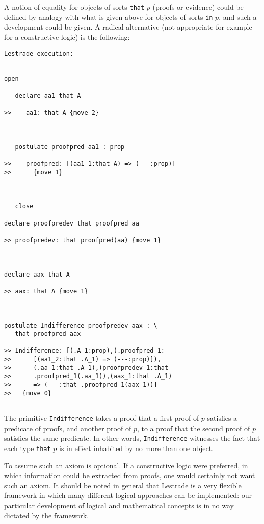 \documentclass[12pt]{article}
\begin{document}
A notion of equality for objects of sorts {\tt that} $p$ (proofs or evidence) could be defined by analogy with what is given above for objects of sorts
{\tt in} $p$, and such a development could be given.  A radical alternative (not appropriate for example for a constructive logic) is the following:

\begin{verbatim}Lestrade execution:


open

   declare aa1 that A

>>    aa1: that A {move 2}



   postulate proofpred aa1 : prop

>>    proofpred: [(aa1_1:that A) => (---:prop)]
>>      {move 1}



   close

declare proofpredev that proofpred aa

>> proofpredev: that proofpred(aa) {move 1}



declare aax that A

>> aax: that A {move 1}



postulate Indifference proofpredev aax : \
   that proofpred aax

>> Indifference: [(.A_1:prop),(.proofpred_1:
>>      [(aa1_2:that .A_1) => (---:prop)]),
>>      (.aa_1:that .A_1),(proofpredev_1:that
>>      .proofpred_1(.aa_1)),(aax_1:that .A_1)
>>      => (---:that .proofpred_1(aax_1))]
>>   {move 0}


\end{verbatim}

The primitive {\tt Indifference} takes a proof that a first proof of $p$ satisfies a predicate of proofs, and another proof of $p$, to a proof that the second proof of $p$ satisfies the same predicate.  In other words, {\tt Indifference} witnesses the fact that each type {\tt that} $p$ is in effect inhabited by no more than one object.

To assume such an axiom is optional.  If a constructive logic were preferred, in which information could be extracted from proofs, one would certainly not want such an axiom.  It should be noted in general that Lestrade is a very flexible framework in which many different logical approaches can be implemented:  our particular development of logical and mathematical concepts is in no way dictated by the framework.
\end{document}
